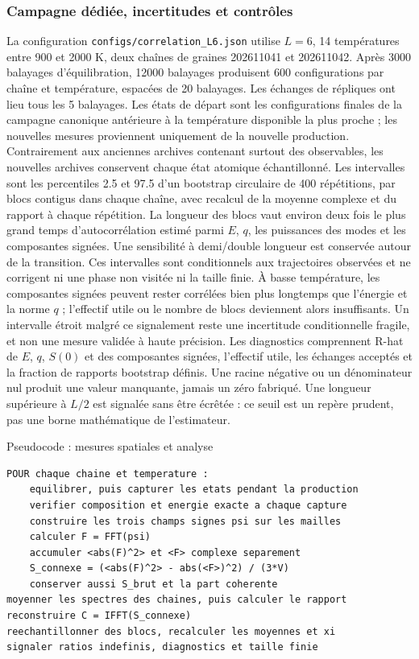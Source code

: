 \subsubsection{Campagne dédiée, incertitudes et contrôles}
La configuration \texttt{configs/correlation\_L6.json} utilise $L=6$, 14 températures entre 900 et 2000 K, deux chaînes de graines 202611041 et 202611042. Après 3000 balayages d'équilibration, 12000 balayages produisent 600 configurations par chaîne et température, espacées de 20 balayages. Les échanges de répliques ont lieu tous les 5 balayages.
Les états de départ sont les configurations finales de la campagne canonique antérieure à la température disponible la plus proche ; les nouvelles mesures proviennent uniquement de la nouvelle production. Contrairement aux anciennes archives contenant surtout des observables, les nouvelles archives conservent chaque état atomique échantillonné.
Les intervalles sont les percentiles 2.5 et 97.5 d'un bootstrap circulaire de 400 répétitions, par blocs contigus dans chaque chaîne, avec recalcul de la moyenne complexe et du rapport à chaque répétition. La longueur des blocs vaut environ deux fois le plus grand temps d'autocorrélation estimé parmi $E$, $q$, les puissances des modes et les composantes signées. Une sensibilité à demi/double longueur est conservée autour de la transition. Ces intervalles sont conditionnels aux trajectoires observées et ne corrigent ni une phase non visitée ni la taille finie. À basse température, les composantes signées peuvent rester corrélées bien plus longtemps que l'énergie et la norme $q$ ; l'effectif utile ou le nombre de blocs deviennent alors insuffisants. Un intervalle étroit malgré ce signalement reste une incertitude conditionnelle fragile, et non une mesure validée à haute précision.
Les diagnostics comprennent R-hat de $E$, $q$, $S(0)$ et des composantes signées, l'effectif utile, les échanges acceptés et la fraction de rapports bootstrap définis. Une racine négative ou un dénominateur nul produit une valeur manquante, jamais un zéro fabriqué. Une longueur supérieure à $L/2$ est signalée sans être écrêtée : ce seuil est un repère prudent, pas une borne mathématique de l'estimateur.
\begin{algocode}{Pseudocode : mesures spatiales et analyse}
\small\begin{verbatim}
POUR chaque chaine et temperature :
    equilibrer, puis capturer les etats pendant la production
    verifier composition et energie exacte a chaque capture
    construire les trois champs signes psi sur les mailles
    calculer F = FFT(psi)
    accumuler <abs(F)^2> et <F> complexe separement
    S_connexe = (<abs(F)^2> - abs(<F>)^2) / (3*V)
    conserver aussi S_brut et la part coherente
moyenner les spectres des chaines, puis calculer le rapport
reconstruire C = IFFT(S_connexe)
reechantillonner des blocs, recalculer les moyennes et xi
signaler ratios indefinis, diagnostics et taille finie
\end{verbatim}
\end{algocode}
